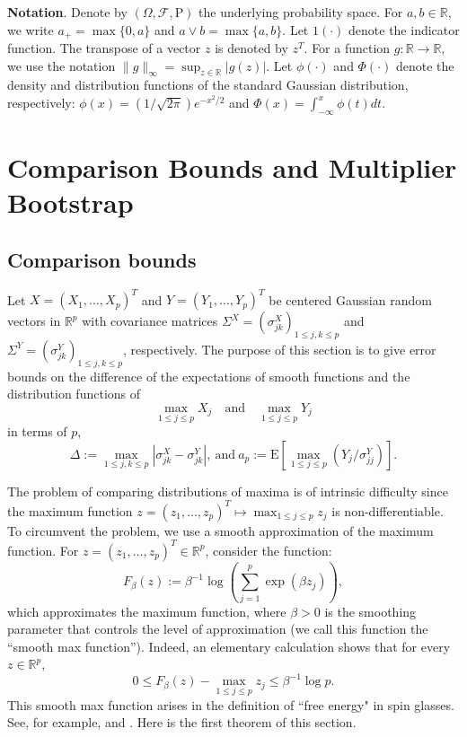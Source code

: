 \documentclass[11pt,reqno]{amsart}
\theoremstyle{definition}
\newcommand{\Ep}{{\mathrm{E}}}
\renewcommand{\Pr}{{\mathrm{P}}}
\newcommand{\RR}{\mathbb{R}}
\begin{document}
{\bf Notation}.
Denote by $(\Omega,\mathcal{F},\Pr)$  the underlying probability space.
For $a,b \in \RR$, we write $a_{+} = \max \{ 0,a \}$ and $a \vee b = \max \{ a,b \}$. Let $1(\cdot)$ denote the indicator function.
The transpose of a vector $z$ is denoted by $z^{T}$. For a function $g: \RR \to \RR$, we use the notation $\| g \|_{\infty} = \sup_{z \in \RR} | g(z) |$. Let $\phi(\cdot)$ and $\Phi (\cdot)$ denote the density and distribution functions of the standard Gaussian distribution, respectively: $\phi(x) = (1/\sqrt{2 \pi}) e^{-x^{2}/2}$ and $\Phi (x) = \int_{-\infty}^{x} \phi(t) dt$.



\section{Comparison Bounds and Multiplier Bootstrap}
\label{sec: Gaus and multiplier}

\subsection{Comparison bounds}


Let $X =(X_{1},\dots,X_{p})^{T}$ and $Y=(Y_{1},\dots,Y_{p})^{T}$ be centered Gaussian random vectors in $\RR^{p}$
with covariance matrices $\Sigma^{X} =(\sigma^{X}_{jk})_{1 \leq j,k \leq p}$ and
$\Sigma^{Y}=(\sigma^{Y}_{jk})_{1 \leq j,k \leq p}$, respectively.
The purpose of this section is to give error bounds on
the difference of the expectations of smooth functions and the distribution functions
of
\begin{equation*}
\max_{1 \leq j \leq p} X_{j} \quad \text{and} \quad \max_{1 \leq j \leq p} Y_{j}
\end{equation*}
in terms of $p$,
\begin{equation*}
\Delta :=\max_{1\leq j,k\leq p} | \sigma^{X}_{jk}-\sigma^{Y}_{jk} |, \  \text{and} \ a_p:=\Ep [ \max_{1 \leq j \leq p} (Y_{j}/\sigma^{Y}_{jj})].
\end{equation*}

The problem of comparing distributions of maxima is  of intrinsic difficulty since the maximum function $z=(z_{1},\dots,z_{p})^{T} \mapsto \max_{1 \leq j \leq p} z_{j}$ is non-differentiable.
To circumvent the problem, we use a smooth approximation of the maximum function. For $z=(z_{1},\dots,z_{p})^{T} \in \RR^{p}$, consider the function:
\begin{equation*}
F_{\beta}(z):=\beta^{-1}\log\left(\sum_{j=1}^{p}\exp(\beta z_{j})\right),
\end{equation*}
which approximates the maximum function, where $\beta > 0$ is the smoothing parameter that controls the level of approximation (we call this function the ``smooth max function'').
Indeed, an elementary calculation shows that for every $z \in \RR^{p}$,
\begin{equation}\label{eq: smooth max property}
0 \leq  F_{\beta}(z)- \max_{1 \leq j \leq p} z_{j} \leq \beta^{-1} \log p.
\end{equation}
This smooth max function arises in the definition of ``free energy" in spin glasses. See, for example, \cite{Talagrand2003} and \cite{Panchenko2013}.
Here is the first theorem of this section.
\end{document}

